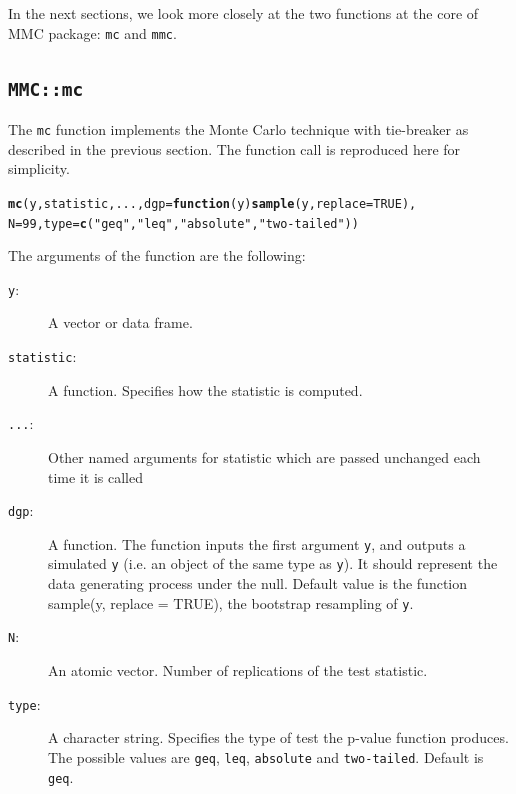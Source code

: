 \documentclass[11pt]{article}\usepackage[]{graphicx}\usepackage[]{color}
\makeatletter
\newcommand{\hlnum}[1]{\textcolor[rgb]{0.686,0.059,0.569}{#1}}%
\newcommand{\hlstr}[1]{\textcolor[rgb]{0.192,0.494,0.8}{#1}}%
\newcommand{\hlstd}[1]{\textcolor[rgb]{0.345,0.345,0.345}{#1}}%
\newcommand{\hlkwa}[1]{\textcolor[rgb]{0.161,0.373,0.58}{\textbf{#1}}}%
\newcommand{\hlkwc}[1]{\textcolor[rgb]{0.333,0.667,0.333}{#1}}%
\newcommand{\hlkwd}[1]{\textcolor[rgb]{0.737,0.353,0.396}{\textbf{#1}}}%
\newenvironment{kframe}{%
 \def\at@end@of@kframe{}%
 \ifinner\ifhmode%
  \def\at@end@of@kframe{\end{minipage}}%
  \begin{minipage}{\columnwidth}%
 \fi\fi%
 \def\FrameCommand##1{\hskip\@totalleftmargin \hskip-\fboxsep
 \colorbox{shadecolor}{##1}\hskip-\fboxsep
     \hskip-\linewidth \hskip-\@totalleftmargin \hskip\columnwidth}%
 \MakeFramed {\advance\hsize-\width
   \@totalleftmargin\z@ \linewidth\hsize
   \@setminipage}}%
 {\par\unskip\endMakeFramed%
 \at@end@of@kframe}
\newenvironment{knitrout}{}{} %
\newcommand{\pkg}[1]{{\normalfont\fontseries{b}\selectfont #1}}
\let\code=\texttt
\makeatother
\begin{document}
In the next sections, we look more closely at the two functions at the core of \pkg{MMC} package: \code{mc} and \code{mmc}.

\subsection{\code{MMC::mc}}

The \code{mc} function implements the Monte Carlo technique with tie-breaker as described in the previous section.
The function call is reproduced here for simplicity.
\begin{knitrout}
\color{fgcolor}\begin{kframe}
\begin{alltt}
\hlkwd{mc}\hlstd{(y, statistic, ...,} \hlkwc{dgp} \hlstd{=} \hlkwa{function}\hlstd{(}\hlkwc{y}\hlstd{)} \hlkwd{sample}\hlstd{(y,} \hlkwc{replace} \hlstd{=} \hlnum{TRUE}\hlstd{),}
    \hlkwc{N} \hlstd{=} \hlnum{99}\hlstd{,} \hlkwc{type} \hlstd{=} \hlkwd{c}\hlstd{(}\hlstr{"geq"}\hlstd{,} \hlstr{"leq"}\hlstd{,} \hlstr{"absolute"}\hlstd{,} \hlstr{"two-tailed"}\hlstd{))}
\end{alltt}
\end{kframe}
\end{knitrout}

The arguments of the function are the following:
\begin{description}
	\item[\code{y}:] A vector or data frame.

	\item[\code{statistic}:] A function. Specifies how the statistic is computed.

	\item[\code{...}:] Other named arguments for statistic which are passed unchanged each time it is
		called

	\item[\code{dgp}:] A function. The function inputs the first argument \code{y}, and outputs a simulated \code{y} (i.e. an object of the same type as \code{y}). It should represent the data generating process under the null. Default value is the function sample(y, replace = TRUE), the bootstrap resampling of \code{y}.

	\item[\code{N}:] An atomic vector. Number of replications of the test statistic.

	\item[\code{type}:] A character string. Specifies the type of test the p-value function produces. The possible values are \code{geq}, \code{leq}, \code{absolute} and \code{two-tailed}. Default is \code{geq}.
\end{description}
\end{document}
